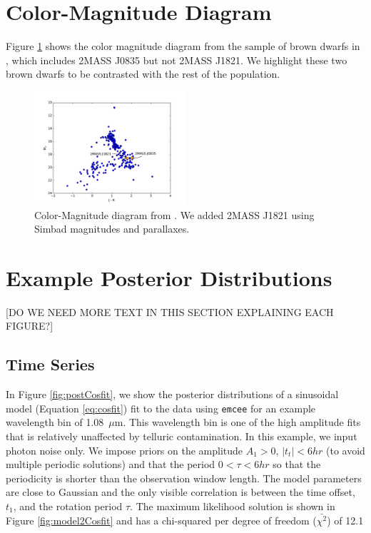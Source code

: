 \documentclass[twocolumn]{aastex6}
\begin{document}
\appendix
\clearpage
\pagebreak

\section{Color-Magnitude Diagram}

Figure \ref{fig:CMD} shows the color magnitude diagram from the sample of brown dwarfs in \citet{dupuy2012ltparallax}, which includes 2MASS J0835 but not 2MASS J1821.
We highlight these two brown dwarfs to be contrasted with the rest of the population.

\begin{figure}
\begin{centering}
\includegraphics[width=0.5\textwidth]{color_mag.pdf}
\caption{Color-Magnitude diagram from \citet{dupuy2012ltparallax}. We added 2MASS J1821 using Simbad magnitudes and parallaxes.}\label{fig:CMD}
\end{centering}
\end{figure}

\pagebreak
\section{Example Posterior Distributions}
[DO WE NEED MORE TEXT IN THIS SECTION EXPLAINING EACH FIGURE?]
\subsection{Time Series}
In Figure \ref{fig:postCosfit}, we show the posterior distributions of a sinusoidal model (Equation \ref{eq:cosfit}) fit to the data using \texttt{emcee} \citep{foreman-mackey2013emcee} for an example wavelength bin of 1.08~$\mu$m.
This wavelength bin is one of the high amplitude fits that is relatively unaffected by telluric contamination.
In this example, we input photon noise only.
We impose priors on the amplitude $A_1 > 0$, $|t_t| < 6 hr$ (to avoid multiple periodic solutions) and that the period $0 < \tau < 6 hr$ so that the periodicity is shorter than the observation window length.
The model parameters are close to Gaussian and the only visible correlation is between the time offset, $t_1$, and the rotation period $\tau$.
The maximum likelihood solution is shown in Figure \ref{fig:model2Cosfit} and has a chi-squared per degree of freedom ($\bar{\chi^2}$) of 12.1
\end{document}
